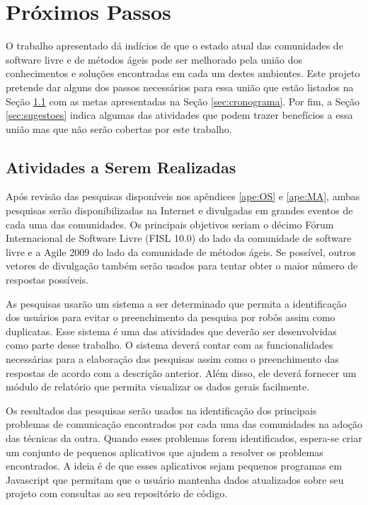 \chapter{Próximos Passos}
\label{cap:perspectivas}

O trabalho apresentado dá indícios de que o estado atual das
comunidades de software livre e de métodos ágeis pode ser melhorado
pela união dos conhecimentos e soluções encontradas em cada um destes
ambientes. Este projeto pretende dar alguns dos passos necessários
para essa união que estão listados na Seção \ref{sec:atividades} com
as metas apresentadas na Seção \ref{sec:cronograma}. Por fim, a Seção
\ref{sec:sugestoes} indica algumas das atividades que podem trazer
benefícios a essa união mas que não serão cobertas por este trabalho.

\section{Atividades a Serem Realizadas}
\label{sec:atividades}

Após revisão das pesquisas disponíveis nos apêndices \ref{ape:OS} e \ref{ape:MA}, ambas pesquisas 
serão disponibilizadas na Internet e
divulgadas em grandes eventos de cada uma das comunidades. Os
principais objetivos seriam o décimo Fórum Internacional de Software
Livre (FISL 10.0) do lado da comunidade de software livre e a Agile
2009 do lado da comunidade de métodos ágeis. Se possível, outros
vetores de divulgação também serão usados para tentar obter o maior
número de respostas possíveis.

As pesquisas usarão um sistema a ser determinado que permita a
identificação dos usuários para evitar o preenchimento da pesquisa por
robôs assim como duplicatas. Esse sistema é uma das atividades que
deverão ser desenvolvidas como parte desse trabalho. O sistema deverá
contar com as funcionalidades necessárias para a elaboração das
pesquisas assim como o preenchimento das respostas de acordo com a
descrição anterior. Além disso, ele deverá fornecer um módulo de
relatório que permita visualizar os dados gerais facilmente.

Os resultados das pesquisas serão usados na identificação dos
principais problemas de comunicação encontrados por cada uma das
comunidades na adoção das técnicas da outra. Quando esses problemas
forem identificados, espera-se criar um conjunto de pequenos
aplicativos que ajudem a resolver os problemas encontrados. A ideia é
de que esses aplicativos sejam pequenos programas em Javascript que
permitam que o usuário mantenha dados atualizados sobre seu projeto
com consultas ao seu repositório de código.

